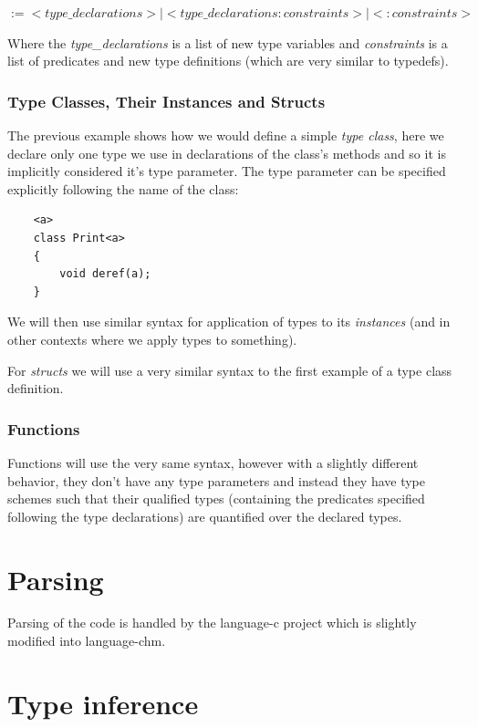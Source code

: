 $:= <type\_declarations> | <type\_declarations : constraints> | < : constraints >$

Where the \emph{type\_declarations} is a list of new type variables and \emph{constraints} is a list of predicates and new type definitions (which are very similar to typedefs).

\subsubsection{Type Classes, Their Instances and Structs}

The previous example shows how we would define a simple \emph{type class}, here we declare only one type we use in declarations of the class's methods and so it is implicitly considered it's type parameter. The type parameter can be specified explicitly following the name of the class:

\begin{lstlisting}
    <a>
    class Print<a>
    {
        void deref(a);
    }
\end{lstlisting}

We will then use similar syntax for application of types to its \emph{instances} (and in other contexts where we apply types to something).

For \emph{structs} we will use a very similar syntax to the first example of a type class definition.

\subsubsection{Functions}

Functions will use the very same syntax, however with a slightly different behavior, they don't have any type parameters and instead they have type schemes such that their qualified types (containing the predicates specified following the type declarations) are quantified over the declared types.

\section{Parsing}

Parsing of the code is handled by the language-c project which is slightly modified into language-chm. %

\section{Type inference}

